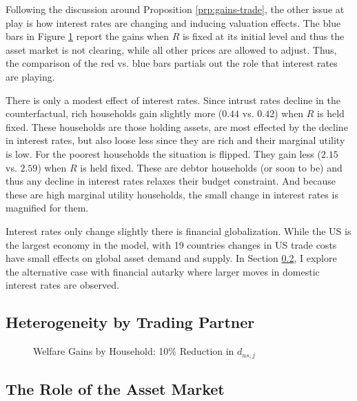\documentclass[12pt,pdftex]{article}
\begin{document}
\begin{onehalfspacing}
Following the discussion around Proposition \ref{prp:gains-trade}, the other issue at play is how interest rates are changing and inducing valuation effects. The blue bars in Figure \ref{fig:welfare-households} report the gains when $R$ is fixed at its initial level and thus the asset market is not clearing, while all other prices are allowed to adjust. Thus, the comparison of the red vs. blue bars partials out the role that interest rates are playing.

There is only a modest effect of interest rates. Since intrust rates decline in the counterfactual, rich households gain slightly more ($0.44$ vs. $0.42$) when $R$ is held fixed. These households are those holding assets, are most effected by the decline in interest rates, but also loose less since they are rich and their marginal utility is low. For the poorest households the situation is flipped. They gain less ($2.15$ vs. $2.59$) when $R$ is held fixed. These are debtor households (or soon to be) and thus any decline in interest rates relaxes their budget constraint. And because these are high marginal utility households, the small change in interest rates is magnified for them.

Interest rates only change slightly there is financial globalization. While the US is the largest economy in the model, with 19 countries changes in US trade costs have small effects on global asset demand and supply.  In Section \ref{sec:asset-market}, I explore the alternative case with financial autarky where larger moves in domestic interest rates are observed.

\subsection{Heterogeneity by Trading Partner}


\begin{figure}[!t]
\caption{Welfare Gains by Household: 10\% Reduction in $d_{us,j}$}\label{fig:welfare-households}
\end{figure}


\subsection{The Role of the Asset Market}\label{sec:asset-market}







\end{onehalfspacing}
\end{document}
